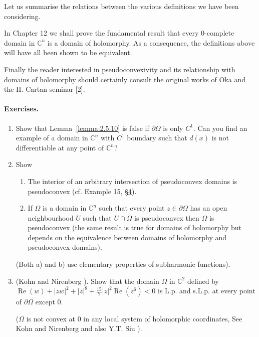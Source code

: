 Let us summarise the relations between the various definitions we have been considering.
\begin{center}
    \begin{minipage}{\linewidth}
        \centering
        
    \end{minipage}
\end{center}
In Chapter 12 we shall prove the fundamental result that every 0-complete domain in $\mathbb C^n$ is a domain of holomorphy. As a consequence, the definitions above will have all been shown to be equivalent.

Finally the reader interested in pseudoconvexivity and its relationship with domains of holomorphy should certainly consult the original works of Oka \cite{bib:I:oka-k:3} and the H. Cartan seminar [2].
\paragraph*{Exercises.}
\begin{enumerate}
\item Show that Lemma~\ref{lemma:2.5.10} is false if $\partial\Omega$ is only $C^1$. Can you find an example of a domain in $\mathbb C^n$ with $C^1$ boundary such that $d(x)$ is not differentiable at any point of $\mathbb C^n$?
\item Show
\begin{enumerate}
\item[a)] The interior of an arbitrary intersection of pseudoconvex domains is pseudoconvex (cf. Example 15, \hyperref[sec:2:4]{\S4}).
\item[b)] If $\Omega$ is a domain in $\mathbb C^n$ such that every point $z\in\partial\Omega$ has an open neighbourhood $U$ such that $U\cap\Omega$ is pseudoconvex then $\Omega$ is pseudoconvex (the same result is true for domains of holomorphy but depends on the equivalence between domains of holomorphy and pseudoconvex domains).
\end{enumerate}
(Both a) and b) use elementary properties of subharmonic functions).
\item (Kohn and Nirenberg \cite{bib:I:kohn-j-j-and-nirenberg-l:1}). Show that the domain $\Omega$ in $\mathbb C^2$ defined by $\operatorname{Re}(w)+|zw|^2+|z|^8+\frac{15}{7}|z|^2\operatorname{Re}(z^6)<0$ is L.p. and s.L.p. at every point of $\partial\Omega$ except 0.

($\Omega$ is not convex at 0 in any local system of holomorphic coordinates, See Kohn and Nirenberg \cite{bib:I:kohn-j-j-and-nirenberg-l:1} and also Y.T. Siu \cite{bib:I:siu-y-t:1}).
\end{enumerate}

